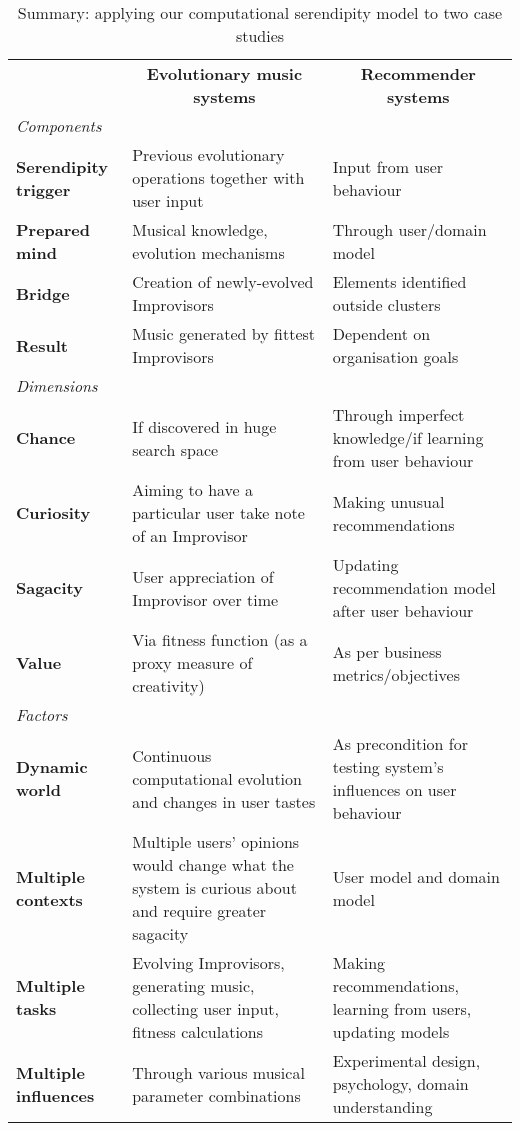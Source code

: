 \begin{table}[Ht!]
{\centering \renewcommand{\arraystretch}{1.5}
\footnotesize
\begin{tabular}{p{.7in}@{\hspace{.1in}}p{1.9in}@{\hspace{.1in}}p{1.9in}}
\multicolumn{1}{c}{} & \multicolumn{1}{c}{\textbf{Evolutionary music systems}} & \multicolumn{1}{c}{\textbf{Recommender systems}} \\[-.1in]
\multicolumn{1}{l}{\em Components} & \multicolumn{1}{c}{} & \multicolumn{1}{c}{} \\
\cline{2-3}
\textbf{Serendipity trigger} & Previous evolutionary operations together with user input & Input from user behaviour \\
\textbf{Prepared mind} & Musical knowledge, evolution mechanisms & Through user/domain model \\
\textbf{Bridge}  & Creation of newly-evolved Improvisors & Elements identified outside clusters \\
\textbf{Result} & Music generated by fittest Improvisors& Dependent on organisation goals \\ \cline{2-3}
\multicolumn{1}{l}{\em Dimensions} & \multicolumn{1}{c}{} & \multicolumn{1}{c}{} \\
\cline{2-3}
\textbf{Chance} & If discovered in huge search space & Through imperfect knowledge/if learning from user behaviour \\
\textbf{Curiosity} & Aiming to have a particular user take note of an Improvisor & Making unusual recommendations \\
\textbf{Sagacity} & User appreciation of Improvisor over time & Updating recommendation model after user behaviour \\
\textbf{Value} & Via fitness function (as a proxy measure of creativity) & As per business metrics/objectives \\
\cline{2-3}
\multicolumn{1}{l}{\em Factors} & \multicolumn{1}{c}{} & \multicolumn{1}{c}{} \\
\cline{2-3}
\textbf{Dynamic world}  & Continuous computational evolution and changes in user tastes& As precondition for testing system's influences on user behaviour\\
\textbf{Multiple contexts} & Multiple users' opinions would change what the system is curious about and require greater sagacity & User model and domain model\\
\textbf{Multiple tasks} & Evolving Improvisors, generating music, collecting user input, fitness calculations & Making recommendations, learning from users, updating models \\
\textbf{Multiple influences} & Through various musical parameter combinations& Experimental design, psychology, domain understanding\\
\cline{2-3}
\end{tabular}
\par}
\bigskip
\caption{Summary: applying our computational serendipity model to two case studies\label{caseStudies}}
\end{table}%
\normalsize

